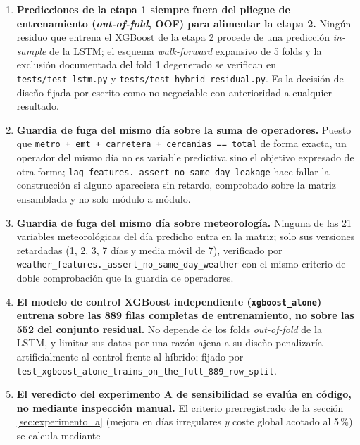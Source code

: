 \begin{sloppypar}
\begin{enumerate}
    \texttt{test\_fourier\_\allowbreak{}is\_\allowbreak{}deterministic\_\allowbreak{}and\_\allowbreak{}split\_\allowbreak{}invariant}.
    La única transformación que se ajusta sobre datos es el escalador del punto anterior.
  \item \textbf{Predicciones de la etapa 1 siempre fuera del pliegue de entrenamiento
    (\emph{out-of-fold}, OOF) para alimentar la etapa 2.} Ningún residuo que entrena el XGBoost de la etapa 2
    procede de una predicción \emph{in-sample} de la LSTM; el esquema
    \emph{walk-forward} expansivo de 5 folds y la exclusión documentada del fold 1
    degenerado se verifican en \texttt{tests/\allowbreak{}test\_lstm.py} y
    \texttt{tests/\allowbreak{}test\_hybrid\_residual.py}. Es la decisión de diseño fijada
    por escrito como no negociable con anterioridad a cualquier resultado.
  \item \textbf{Guardia de fuga del mismo día sobre la suma de operadores.} Puesto
    que \texttt{metro + emt + carretera + cercanias == total} de forma exacta, un
    operador del mismo día no es variable predictiva sino el objetivo expresado de otra
    forma; \texttt{lag\_features.\_assert\_no\_same\_day\_leakage} hace fallar la
    construcción si alguno apareciera sin retardo, comprobado sobre la matriz ensamblada
    y no solo módulo a módulo.
  \item \textbf{Guardia de fuga del mismo día sobre meteorología.} Ninguna de las 21
    variables meteorológicas del día predicho entra en la matriz; solo sus versiones
    retardadas (1, 2, 3, 7 días y media móvil de 7), verificado por
    \texttt{weather\_features.\_assert\_no\_same\_day\_weather} con el mismo criterio de
    doble comprobación que la guardia de operadores.
  \item \textbf{El modelo de control XGBoost independiente (\texttt{xgboost\_alone}) entrena sobre las 889
    filas completas de entrenamiento, no sobre las 552 del conjunto residual.} No
    depende de los folds \emph{out-of-fold} de la LSTM, y limitar sus datos por una
    razón ajena a su diseño penalizaría artificialmente al control frente al híbrido;
    fijado por
    \texttt{test\_xgboost\_\allowbreak{}alone\_\allowbreak{}trains\_\allowbreak{}on\_\allowbreak{}the\_\allowbreak{}full\_\allowbreak{}889\_\allowbreak{}row\_\allowbreak{}split}.
  \item \textbf{El veredicto del experimento A de sensibilidad se evalúa en código, no
    mediante inspección manual.} El criterio prerregistrado de la sección \ref{sec:experimento_a} (mejora en
    días irregulares \emph{y} coste global acotado al 5\,\%) se calcula mediante

\end{enumerate}
\end{sloppypar}

